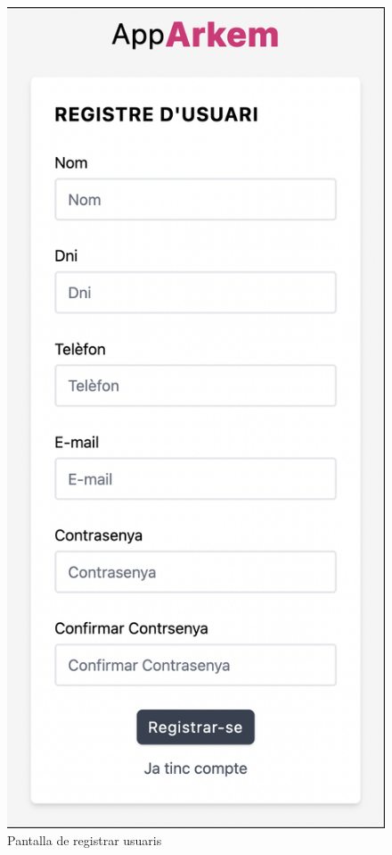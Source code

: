 \begin{figure}[H]
    \begin{center}
        \includegraphics[scale=0.50]{Fotos/pantalla1_registre.png}
    \end{center}
    \caption{Pantalla de registrar usuaris}
    \label{fig:register_photo}
\end{figure}


